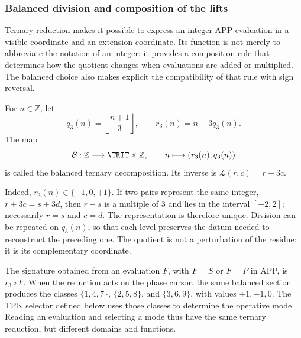 \subsubsection{Balanced division and composition of the lifts}
\label{trit-ampl-div-balanceada}

Ternary reduction makes it possible to express an integer APP evaluation in a
visible coordinate and an extension coordinate. Its function is not
merely to abbreviate the notation of an integer: it provides a composition
rule that determines how the quotient changes when evaluations are added or
multiplied. The balanced choice also makes explicit the
compatibility of that rule with sign reversal.

\begin{definition}
\label{trit-ampl-def-coordenadas}
For \(n\in\mathbb Z\), let
\[
 q_3(n)=\left\lfloor\frac{n+1}{3}\right\rfloor,\qquad
 r_3(n)=n-3q_3(n).
\]
The map
\[
 \mathcal B:\mathbb Z\longrightarrow\TRIT\times\mathbb Z,\qquad
 n\longmapsto(r_3(n),q_3(n))
\]
is called the balanced ternary decomposition. Its inverse is
\(\mathcal L(r,c)=r+3c\).
\end{definition}

Indeed, \(r_3(n)\in\{-1,0,+1\}\). If two pairs represent the same integer,
\(r+3c=s+3d\), then \(r-s\) is a multiple of \(3\) and lies in the interval
\([-2,2]\); necessarily \(r=s\) and \(c=d\). The representation is therefore
unique. Division can be repeated on \(q_3(n)\), so that each level
preserves the datum needed to reconstruct the preceding one. The quotient is not a
perturbation of the residue: it is its complementary coordinate.

The signature obtained from an evaluation \(F\), with \(F=S\) or \(F=P\) in APP,
is \(r_3\circ F\). When the reduction acts on the phase cursor, the same
balanced section produces the classes \(\{1,4,7\}\), \(\{2,5,8\}\), and
\(\{3,6,9\}\), with values \(+1,-1,0\). The TPK selector defined
below uses those classes to determine the operative mode.
Reading an evaluation and selecting a mode thus have the same
ternary reduction, but different domains and functions.

